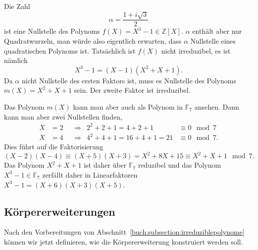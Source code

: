 \begin{beispiel}
Die Zahl 
\[
\alpha = \frac{1+i\sqrt{3}}2
\]
ist eine Nullstelle des Polynoms $f(X)=X^3-1\in\mathbb{Z}[X]$.
$\alpha$ enthält aber nur Quadratwurzeln, man würde also eigentlich
erwarten, dass $\alpha$ Nullstelle eines quadratischen Polynoms ist.
Tatsächlich ist $f(X)$ nicht irreduzibel,  es ist nämlich
\[
X^3-1 = (X-1)(X^2+X+1).
\]
Da $\alpha$ nicht Nullstelle des ersten Faktors ist, muss es Nullstelle
des Polynoms $m(X)=X^2+X+1$ sein.
Der zweite Faktor ist irreduzibel.

Das Polynom $m(X)$ kann man aber auch als Polynom in $\mathbb{F}_7$ 
ansehen.
Dann kann man aber zwei Nullstellen finden,
\[
\begin{aligned}
X&=2&&\Rightarrow& 2^2+2+1=4+2+1&\equiv 0\mod 7
\\
X&=4&&\Rightarrow& 4^2+4+1=16+4+1=21&\equiv 0\mod 7.
\end{aligned}
\]
Dies führt auf die Faktorisierung
\[
(X-2)(X-4)
\equiv
(X+5)(X+3)
=
X^2+8X+15
\equiv
X^2+X+1\mod 7.
\]
Das Polynom $X^2+X+1$ ist daher über $\mathbb{F}_7$ reduzibel und
das Polynom $X^3-1\in\mathbb{F}_7$ zerfällt daher in Linearfaktoren
$X^3-1=(X+6)(X+3)(X+5)$.
\end{beispiel}


\subsection{Körpererweiterungen
\label{buch:subsection:koerpererweiterungen}}
Nach den Vorbereitungen von
Abschnitt~\ref{buch:subsection:irreduziblepolynome}
können wir jetzt definieren, wie die Körpererweiterung
konstruiert werden soll.

